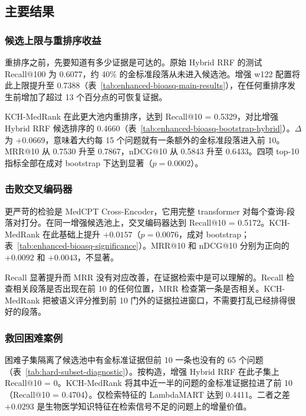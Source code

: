 \subsection{主要结果}
\label{sec:main-results}

\subsubsection{候选上限与重排序收益}

重排序之前，先要知道有多少证据是可达的。原始 Hybrid RRF 的测试 Recall@100 为 0.6077，约 40\% 的金标准段落从未进入候选池。增强 w122 配置将此上限提升至 0.7388（表~\ref{tab:enhanced-bioasq-main-results}），在任何重排序发生前增加了超过 13 个百分点的可恢复证据。



KCH-MedRank 在此更大池内重排序，达到 Recall@10 = 0.5329，对比增强 Hybrid RRF 候选排序的 0.4660（表~\ref{tab:enhanced-bioasq-bootstrap-hybrid}）。$\Delta$ 为 $+0.0669$，意味着大约每 15 个问题就有一条额外的金标准段落进入前 10。MRR@10 从 0.7530 升至 0.7867，nDCG@10 从 0.5843 升至 0.6433。四项 top-10 指标全部在成对 bootstrap 下达到显著（$p=0.0002$）。



\subsubsection{击败交叉编码器}

更严苛的检验是 MedCPT Cross-Encoder，它用完整 transformer 对每个查询-段落对打分。在同一增强候选池上，交叉编码器达到 Recall@10 = 0.5172。KCH-MedRank 在此基础上提升 $+0.0157$（$p=0.0076$，成对 bootstrap；表~\ref{tab:enhanced-bioasq-significance}）。MRR@10 和 nDCG@10 分别为正向的 $+0.0092$ 和 $+0.0043$，不显著。



Recall 显著提升而 MRR 没有对应改善，在证据检索中是可以理解的。Recall 检查相关段落是否出现在前 10 的任何位置，MRR 检查第一条是否相关。KCH-MedRank 把被语义评分推到前 10 门外的证据拉进窗口，不需要打乱已经排得很好的段落。

\subsubsection{救回困难案例}

困难子集隔离了候选池中有金标准证据但前 10 一条也没有的 65 个问题（表~\ref{tab:hard-subset-diagnostic}）。按构造，增强 Hybrid RRF 在此子集上 Recall@10 = 0。KCH-MedRank 将其中近一半的问题的金标准证据拉进了前 10（Recall@10 = 0.4704）。仅检索特征的 LambdaMART 达到 0.4411。二者之差 $+0.0293$ 是生物医学知识特征在检索信号不足的问题上的增量价值。

